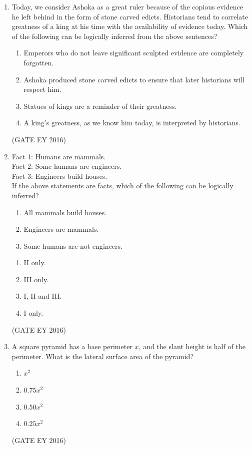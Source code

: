 \documentclass[journal]{IEEEtran}
\begin{document}
\begin{enumerate}
\item Today, we consider Ashoka as a great ruler because of the copious evidence he left behind in the form of stone carved edicts. Historians tend to correlate greatness of a king at his time with the availability of evidence today. Which of the following can be logically inferred from the above sentences?
\begin{enumerate}
    \item Emperors who do not leave significant sculpted evidence are completely forgotten.
    \item Ashoka produced stone carved edicts to ensure that later historians will respect him.
    \item Statues of kings are a reminder of their greatness.
    \item A king's greatness, as we know him today, is interpreted by historians.
    \end{enumerate}
\hfill{(GATE EY 2016)}

\item Fact 1: Humans are mammals. \\
Fact 2: Some humans are engineers. \\
Fact 3: Engineers build houses.
\\
If the above statements are facts, which of the following can be logically inferred? 
  \begin{enumerate}[label=\Roman*.]
    \item All mammals build houses. 
    \item  Engineers are mammals. 
    \item Some humans are not engineers.
  \end{enumerate}
\begin{multicols}{2}
\begin{enumerate}
    \item II only.
    \item III only.
    \item I, II and III.
    \item I only.
    \end{enumerate}
\end{multicols}
\hfill{(GATE EY 2016)}

\item A square pyramid has a base perimeter $x$, and the slant height is half of the perimeter. What is the lateral surface area of the pyramid?
\begin{multicols}{4}
\begin{enumerate}
    \item $x^{2}$
    \item $0.75 x^{2}$
    \item $0.50 x^{2}$
    \item $0.25 x^{2}$
\end{enumerate}
\end{multicols}
\hfill{(GATE EY 2016)}


\end{enumerate}
\end{document}
